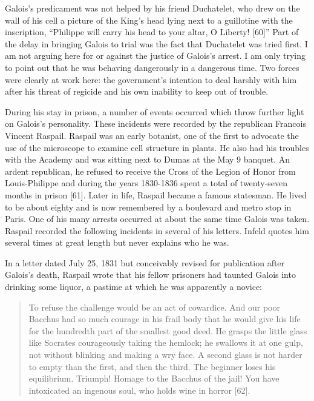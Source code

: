 \documentclass[12pt]{article}
\begin{document}
Galois's predicament was not helped by his friend Duchatelet, who drew on the wall of his cell a picture of the King's head lying next to a guillotine with the inscription, ``Philippe will carry his head to your altar, O Liberty! [60]'' Part of the delay in bringing Galois to trial was the fact that Duchatelet was tried first. I am not arguing here for or against the justice of Galois's arrest. I am only trying to point out that he was behaving dangerously in a dangerous time. Two forces were clearly at work here: the government's intention to deal harshly with him after his threat of regicide and his own inability to keep out of trouble.

During his stay in prison, a number of events occurred which throw further light on Galois's personality. These incidents were recorded by the republican Francois Vincent Raspail. Raspail was an early botanist, one of the first to advocate the use of the microscope to examine cell structure in plants. He also had his troubles with the Academy and was sitting next to Dumas at the May 9 banquet. An ardent republican, he refused to receive the Cross of the Legion of Honor from Louis-Philippe and during the years 1830-1836 spent a total of twenty-seven months in prison [61]. Later in life, Raspail became a famous statesman. He lived to be about eighty and is now remembered by a boulevard and metro stop in Paris. One of his many arrests occurred at about the same time Galois was taken. Raspail recorded the following incidents in several of his letters. Infeld quotes him several times at great length but never explains who he was.

In a letter dated July 25, 1831 but conceivably revised for publication after Galois's death, Raspail wrote that his fellow prisoners had taunted Galois into drinking some liquor, a pastime at which he was apparently a novice:

\begin{quote}
To refuse the challenge would be an act of cowardice. And our poor Bacchus had so much courage in his frail body that he would give his life for the hundredth part of the smallest good deed. He grasps the little glass like Socrates courageously taking the hemlock; he swallows it at one gulp, not without blinking and making a wry face. A second glass is not harder to empty than the first, and then the third. The beginner loses his equilibrium. Triumph! Homage to the Bacchus of the jail! You have intoxicated an ingenous soul, who holds wine in horror [62].
\end{quote}
\end{document}
